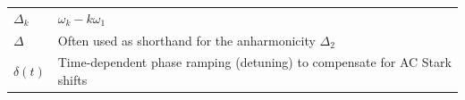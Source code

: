 \begin{table}[htbp]
\begin{tabular}{l p{11cm}}
    ${\Delta}_k$               & $\omega_k - k\omega_1$                                                            \\
    $\Delta$                   & Often used as shorthand for the anharmonicity $\Delta_2$                          \\
    $\delta(t)$                & Time-dependent phase ramping (detuning) to compensate for AC Stark shifts         \\
    \hline
  \end{tabular}
\end{table}
